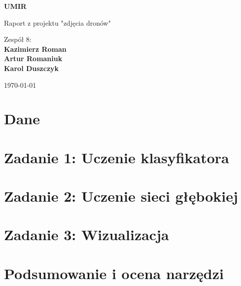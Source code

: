 \documentclass[a4paper]{article}
\begin{document}
\begin{titlepage}
    \begin{center}
        \vspace*{1cm}
            
        \Huge
        \textbf{UMIR}
            
        \vspace{0.5cm}
        \LARGE
        Raport z projektu "zdjęcia dronów"
            
        \vspace{1.5cm}
            
        Zespół 8:\\
        \textbf{Kazimierz Roman\\
                Artur Romaniuk\\
                Karol Duszczyk}
            
        \vfill

        \vspace{0.8cm}
            
        \Large
        \today
        
            
    \end{center}
\end{titlepage}

\tableofcontents

\newpage

\section{Dane}


\section{Zadanie 1: Uczenie klasyfikatora}


\section{Zadanie 2: Uczenie sieci głębokiej}


\section{Zadanie 3: Wizualizacja}


\section{Podsumowanie i ocena narzędzi}

\end{document}

